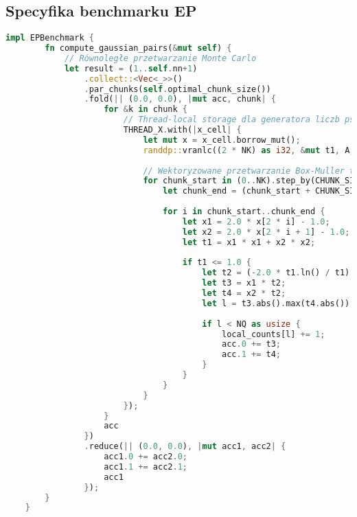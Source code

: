   \subsection{Specyfika benchmarku EP}
  \begin{lstlisting}[language=Rust, caption={Implementacja benchmarku EP w języku Rust}, label={lst:ep_rust}]
    impl EPBenchmark {
        fn compute_gaussian_pairs(&mut self) {
            // Równoległe przetwarzanie Monte Carlo
            let result = (1..self.nn+1)
                .collect::<Vec<_>>()
                .par_chunks(self.optimal_chunk_size())
                .fold(|| (0.0, 0.0), |mut acc, chunk| {
                    for &k in chunk {
                        // Thread-local storage dla generatora liczb pseudolosowych
                        THREAD_X.with(|x_cell| {
                            let mut x = x_cell.borrow_mut();
                            randdp::vranlc((2 * NK) as i32, &mut t1, A, &mut x);
                            
                            // Wektoryzowane przetwarzanie Box-Muller transform
                            for chunk_start in (0..NK).step_by(CHUNK_SIZE) {
                                let chunk_end = (chunk_start + CHUNK_SIZE).min(NK);
                                
                                for i in chunk_start..chunk_end {
                                    let x1 = 2.0 * x[2 * i] - 1.0;
                                    let x2 = 2.0 * x[2 * i + 1] - 1.0;
                                    let t1 = x1 * x1 + x2 * x2;
                                    
                                    if t1 <= 1.0 {
                                        let t2 = (-2.0 * t1.ln() / t1).sqrt();
                                        let t3 = x1 * t2;
                                        let t4 = x2 * t2;
                                        let l = t3.abs().max(t4.abs()) as usize;
                                        
                                        if l < NQ as usize {
                                            local_counts[l] += 1;
                                            acc.0 += t3;
                                            acc.1 += t4;
                                        }
                                    }
                                }
                            }
                        });
                    }
                    acc
                })
                .reduce(|| (0.0, 0.0), |mut acc1, acc2| {
                    acc1.0 += acc2.0;
                    acc1.1 += acc2.1;
                    acc1
                });
        }
    }
\end{lstlisting}
